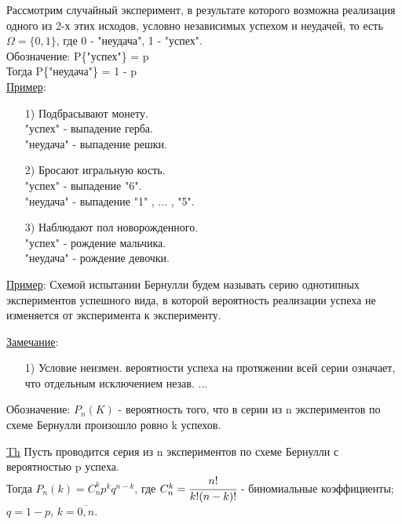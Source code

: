 
Рассмотрим случайный эксперимент, в результате которого возможна реализация одного из 2-х этих исходов, условно независимых успехом и неудачей, то есть \\
$\Omega = \{0,1\}$, где 0 - "неудача", 1 - "успех". \\
Обозначение: P\{"успех"\} = p \\
Тогда P\{"неудача"\} = 1 - p \\

\underline{Пример}:
\begin{enumerate}
	\item[1)]
	Подбрасывают монету. \\
	"успех" - выпадение герба. \\
	"неудача" - выпадение решки. \\
	
	\item[2)]
	Бросают игральную кость. \\
	"успех" - выпадение "6". \\
	"неудача" - выпадение "1" , ... , "5". \\
	
	\item[3)]
	Наблюдают пол новорожденного. \\
	"успех" - рождение мальчика. \\
	"неудача" - рождение девочки. \\
\end{enumerate}

\underline{Пример}: Схемой испытании Бернулли будем называть серию однотипных экспериментов успешного вида, в которой вероятность реализации успеха не изменяется от эксперимента к эксперименту.

\underline{Замечание}: 
\begin{enumerate}
	\item[1)]
	Условие неизмен. вероятности успеха на протяжении всей серии означает, что отдельным исключением незав. ...
\end{enumerate}

Обозначение: $P_n(K)$ - вероятность того, что в серии из n экспериментов по схеме Бернулли произошло ровно k успехов.

\underline{Th} Пусть проводится серия из n экспериментов по схеме Бернулли с вероятностью p успеха. \\
Тогда
$P_n(k) = C^k_n p^k q^{n-k}$, где $C^k_n = \cfrac{n!}{k! (n-k)!}$ - биномиальные коэффициенты; $q = 1 - p$, $k = \overline{0,n}$.


